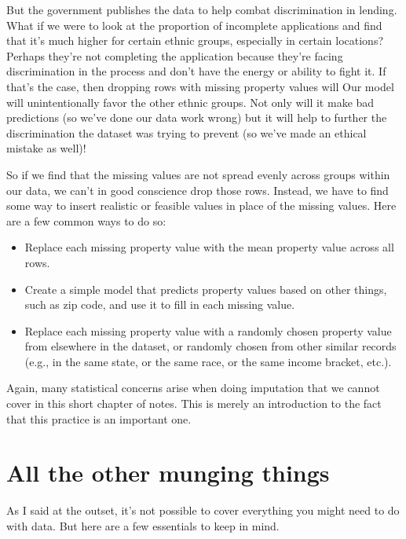 \documentclass[letterpaper,10pt,english]{sphinxmanual}
\begin{document}
But the government publishes the data to help combat discrimination in lending.  What if we were to look at the proportion of incomplete applications and find that it’s much higher for certain ethnic groups, especially in certain locations?  Perhaps they’re not completing the application because they’re facing discrimination in the process and don’t have the energy or ability to fight it.  If that’s the case, then dropping rows with missing property values will   Our model will unintentionally favor the other ethnic groups.  Not only will it make bad predictions (so we’ve done our data work wrong) but it will help to further the discrimination the dataset was trying to prevent (so we’ve made an ethical mistake as well)!

So if we find that the missing values are not spread evenly across groups within our data, we can’t in good conscience drop those rows.  Instead, we have to find some way to insert realistic or feasible values in place of the missing values.  Here are a few common ways to do so:
\begin{itemize}
\item {} 
 \sphinxhyphen{} Replace each missing property value with the mean property value across all rows.

\item {} 
 \sphinxhyphen{} Create a simple model that predicts property values based on other things, such as zip code, and use it to fill in each missing value.

\item {} 
 \sphinxhyphen{} Replace each missing property value with a randomly chosen property value from elsewhere in the dataset, or randomly chosen from other similar records (e.g., in the same state, or the same race, or the same income bracket, etc.).

\end{itemize}

Again, many statistical concerns arise when doing imputation that we cannot cover in this short chapter of notes.  This is merely an introduction to the fact that this practice is an important one.


\section{All the other munging things}
\label{\detokenize{chapter-13-etl:all-the-other-munging-things}}
As I said at the outset, it’s not possible to cover everything you might need to do with data.  But here are a few essentials to keep in mind.
\end{document}
